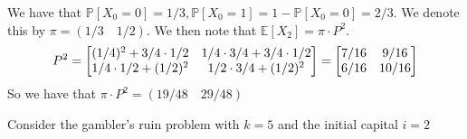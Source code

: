 \documentclass[12pt,twoside, letter]{exam}
\theoremstyle{definition}
\newcommand{\ee}{\mathbb{E}}
\newcommand{\pp}{\mathbb{P}}
\begin{document}
\begin{solution}
  We have that $\pp[X_0 = 0] = 1/3, \pp[X_0 = 1] = 1-\pp[X_0 = 0] = 2/3$. We denote this by $\pi = (1/3 \quad 1/2)$.
  We then note that $\ee[X_2] = \pi \cdot P^{2}$. \\

  \begin{align*}
    \centering
    P^2 =
      \begin{bmatrix}
        (1/4)^2+3/4\cdot 1/2 & 1/4 \cdot 3/4 + 3/4 \cdot 1/2 \\
        1/4 \cdot 1/2 + (1/2)^2 & 1/2 \cdot 3/4 + (1/2)^2 \\
      \end{bmatrix}
      =
      \begin{bmatrix}
        7/16 & 9/16 \\
        6/16 & 10/16 \\
      \end{bmatrix}
  \end{align*}
  So we have that $\pi \cdot P^2 = (19/48 \quad 29/48)$
\end{solution}


\par{Consider the gambler's ruin problem with $k=5$ and the initial capital $i=2$}
\end{document}
